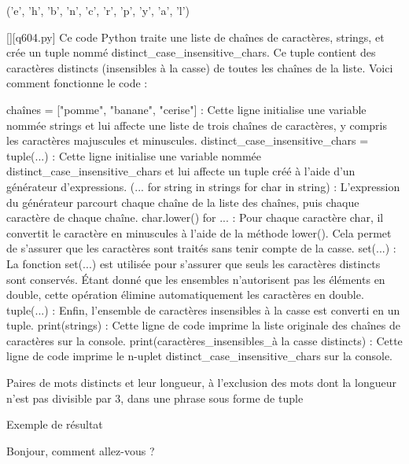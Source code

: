 ('e', 'h', 'b', 'n', 'c', 'r', 'p', 'y', 'a', 'l')
        \par
        \begin{solution}
            \renewcommand{\nomfichier}{q604.py}
            \pythonfile{\chemincode \nomfichier}[][\nomfichier]
            Ce code Python traite une liste de chaînes de caractères, strings, et crée un tuple nommé distinct_case_insensitive_chars. Ce tuple contient des caractères distincts (insensibles à la casse) de toutes les chaînes de la liste. Voici comment fonctionne le code :

    chaînes = ["pomme", "banane", "cerise"] : Cette ligne initialise une variable nommée strings et lui affecte une liste de trois chaînes de caractères, y compris les caractères majuscules et minuscules.
    distinct_case_insensitive_chars = tuple(...) : Cette ligne initialise une variable nommée distinct_case_insensitive_chars et lui affecte un tuple créé à l'aide d'un générateur d'expressions.
        (... for string in strings for char in string) : L'expression du générateur parcourt chaque chaîne de la liste des chaînes, puis chaque caractère de chaque chaîne.
        char.lower() for ... : Pour chaque caractère char, il convertit le caractère en minuscules à l'aide de la méthode lower(). Cela permet de s'assurer que les caractères sont traités sans tenir compte de la casse.
    set(...) : La fonction set(...) est utilisée pour s'assurer que seuls les caractères distincts sont conservés. Étant donné que les ensembles n'autorisent pas les éléments en double, cette opération élimine automatiquement les caractères en double.
    tuple(...) : Enfin, l'ensemble de caractères insensibles à la casse est converti en un tuple.
    print(strings) : Cette ligne de code imprime la liste originale des chaînes de caractères sur la console.
    print(caractères_insensibles_à la casse distincts) : Cette ligne de code imprime le n-uplet distinct_case_insensitive_chars sur la console.
        \end{solution}
        

        \question
        Paires de mots distincts et leur longueur, à l'exclusion des mots dont la longueur n'est pas divisible par 3, dans une phrase sous forme de tuple

Exemple de résultat

Bonjour, comment allez-vous ?

